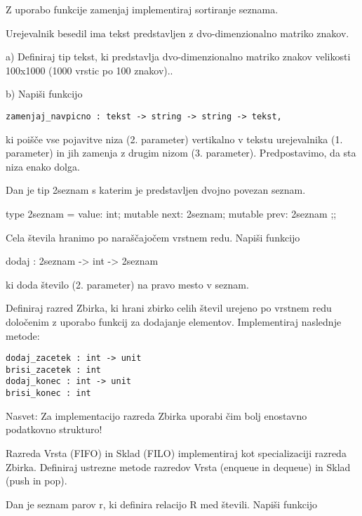 \begin{ex}
Z uporabo funkcije zamenjaj implementiraj sortiranje seznama.


\end{ex} \begin{ex}
Urejevalnik besedil ima tekst predstavljen z dvo-dimenzionalno matriko znakov. 

a) Definiraj tip tekst, ki predstavlja dvo-dimenzionalno matriko znakov velikosti 100x1000 (1000 vrstic po 100 znakov).. 

b) Napi\v si funkcijo 

\begin{verbatim}
zamenjaj_navpicno : tekst -> string -> string -> tekst, 
\end{verbatim}

ki poi\v s\v ce vse pojavitve niza (2. parameter) vertikalno v tekstu urejevalnika (1. parameter) in jih zamenja z drugim nizom (3. parameter). Predpostavimo, da sta niza enako dolga.


\end{ex} \begin{ex}
Dan je tip 2seznam s katerim je predstavljen dvojno povezan seznam. 

type 2seznam = {
    value: int;
    mutable next: 2seznam;
    mutable prev: 2seznam
  } ;;

Cela \v stevila hranimo po nara\v s\v cajo\v cem vrstnem redu. Napi\v si funkcijo 

dodaj : 2seznam -> int -> 2seznam 

ki doda \v stevilo (2. parameter) na pravo mesto v seznam. 


\end{ex} \begin{ex}
Definiraj razred Zbirka, ki hrani zbirko celih \v stevil urejeno po vrstnem redu dolo\v cenim z uporabo funkcij za dodajanje elementov. Implementiraj naslednje metode: 

\begin{verbatim}
dodaj_zacetek : int -> unit
brisi_zacetek : int 
dodaj_konec : int -> unit
brisi_konec : int  

\end{verbatim}
Nasvet: Za implementacijo razreda Zbirka uporabi \v cim bolj enostavno podatkovno strukturo!

Razreda Vrsta (FIFO) in Sklad (FILO) implementiraj kot specializaciji razreda Zbirka. Definiraj ustrezne metode razredov Vrsta (enqueue in dequeue) in Sklad (push in pop). 



\end{ex} \begin{ex}
Dan je seznam parov r, ki definira relacijo R med \v stevili. Napi\v si funkcijo 


\end{ex}
